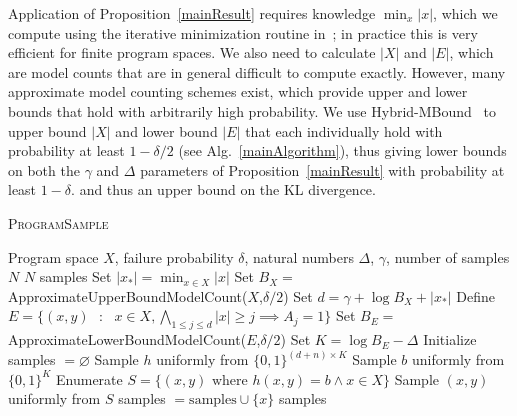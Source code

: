 \documentclass{article}
\newcommand{\theSystem}{\textsc{ProgramSample}}
\begin{document}
  Application of Proposition~\ref{mainResult} requires knowledge $\min_x |x|$, which we compute using the iterative minimization routine in~\cite{singh2013automated}; in practice this is very efficient for finite program spaces. We also need to calculate $|X|$ and $|E|$, which are model counts that are in general difficult to compute exactly.
  However, many approximate model counting schemes exist, which provide upper and lower bounds that hold with arbitrarily high probability.
  We use Hybrid-MBound~\cite{gomes2006model} to upper bound $|X|$ and lower bound $|E|$ that each individually hold with probability at least $1-\delta / 2$ (see Alg.~\ref{mainAlgorithm}), thus
  giving lower bounds on both the $\gamma$ and $\Delta$ parameters of Proposition~\ref{mainResult} with probability at least $1-\delta$.
  and thus an upper bound on the KL divergence. 
 
  \begin{algorithm}[tb]
   \caption{\theSystem{}}
   \label{mainAlgorithm}
\begin{algorithmic}
   Program space $X$, failure probability $\delta$, natural numbers $\Delta$, $\gamma$,
  number of samples $N$
   $N$ samples 
  \STATE Set $|x_*| = \min_{x\in X} |x|$
  \STATE Set $B_X = $ ApproximateUpperBoundModelCount($X$,$\delta/2$)
  \STATE Set $d = \gamma + \log B_X + |x_* |$
  \STATE Define $E = \{(x,y) \text{ }:\text{ } x\in X,  \bigwedge_{1\leq j \leq d}  |x|\geq j\implies A_j=1 \}$
  \STATE Set $B_E = $ ApproximateLowerBoundModelCount($E$,$\delta/2$)
  \STATE Set $K = \log B_E - \Delta$
  \STATE Initialize samples $ = \varnothing$
  \REPEAT
  \STATE Sample $h$ uniformly from $\{0,1\}^{(d+n)\times K}$
  \STATE Sample $b$ uniformly from $\{0,1\}^{K}$
  \STATE Enumerate $S = \{ (x,y) \text{ where } h(x,y) = b \wedge x\in X\}$
  \STATE Sample $(x,y)$ uniformly from $S$
  \STATE samples $ = \text{samples}\cup \{x\}$
  \ENDIF
   \ENDIF
    samples
\end{algorithmic}
\end{algorithm}
\end{document}
